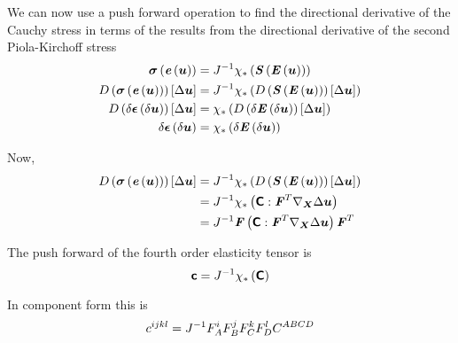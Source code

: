 We can now use a push forward operation to find the directional derivative of the
Cauchy stress in terms of the results from the directional derivative of the second
Piola-Kirchoff stress \ie
\begin{equation}
  \begin{split}
     \boldsymbol{\mathit{\sigma}}\left(  \boldsymbol{\mathit{e}}\left( \boldsymbol{u} \right)  \right) &=
    {J}^{-1} \chi_{*}\left(  \boldsymbol{\mathit{S}}\left(  \boldsymbol{\mathit{E}}\left( \boldsymbol{u} \right)  \right)  \right) \\
       D\left(  \boldsymbol{\mathit{\sigma}}\left(  \boldsymbol{\mathit{e}}\left( \boldsymbol{u} \right)  \right)  \right) \left[ \Delta\boldsymbol{u} \right]  &=
    {J}^{-1} \chi_{*}\left(    D\left(  \boldsymbol{\mathit{S}}\left(  \boldsymbol{\mathit{E}}\left( \boldsymbol{u} \right)  \right)  \right) \left[ \Delta\boldsymbol{u} \right]   \right) \\
       D\left( \delta \boldsymbol{\mathit{\epsilon}}\left( \delta\boldsymbol{u} \right)  \right) \left[ \Delta\boldsymbol{u} \right]  &=
     \chi_{*}\left(    D\left( \delta \boldsymbol{\mathit{E}}\left( \delta\boldsymbol{u} \right)  \right) \left[ \Delta\boldsymbol{u} \right]   \right) \\
    \delta \boldsymbol{\mathit{\epsilon}}\left( \delta\boldsymbol{u} \right) &= \chi_{*}\left( \delta \boldsymbol{\mathit{E}}\left( \delta\boldsymbol{u} \right)  \right) 
  \end{split}
\end{equation}

Now,
\begin{equation}
  \begin{split}
    \directionalderiv{\fnof{\tensor{\sigma}}{\fnof{\tensor{e}}{\vectr{u}}}}{\Delta\vectr{u}}&=
    \inverse{J}\pushforward{\chi}{\pbrac{\directionalderiv{\fnof{\tensor{S}}{\fnof{\tensor{E}}{\vectr{u}}}}{\Delta\vectr{u}}}}\\
    &=\inverse{J}\pushforward{\chi}{\pbrac{\doubledotprod{\tensorfour{C}}{\transpose{\tensortwo{F}}\gradient{\vectr{X}}{\Delta\vectr{u}}}}}\\
    &=\inverse{J}\tensor{F}\pbrac{\doubledotprod{\tensorfour{C}}{\transpose{\tensortwo{F}}\gradient{\vectr{X}}{\Delta\vectr{u}}}}\transpose{\tensor{F}}
  \end{split}
\end{equation}

The push forward of the fourth order elasticity tensor is
\begin{equation}
  \boldsymbol{\mathsf{c}}={J}^{-1} \chi_{*}\left( \boldsymbol{\mathsf{C}} \right) 
\end{equation}

In component form this is
\begin{equation}
  c^{ijkl}={J}^{-1}F^{i}_{A}F^{j}_{B}F^{k}_{C}F^{l}_{D}C^{ABCD}
\end{equation}


